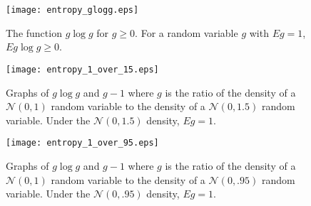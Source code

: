 \begin{subappendices}
\begin{figure}[htp]
\centering
\texttt{[image: entropy\_glogg.eps]}
\caption[$g \log g$ for $g \geq 0$]{The function $g \log g$ for $g \geq 0$. For a random variable $g$ with $E g =1$, $E g \log g \geq 0$.}\label{fig_glogg3}
\end{figure}

\begin{figure}[htp]
\centering
\texttt{[image: entropy\_1\_over\_15.eps]}
\caption[$g \log g$ and $g-1$]{Graphs of $g \log g$ and $g-1$ where  $g$ is the ratio of the density of a ${\mathcal N}(0,1)$ random variable to the density of a ${\mathcal N}(0,1.5)$ random variable.
Under the ${\mathcal N}(0,1.5)$ density, $E g =1$.}\label{fig_glogg1}
\end{figure}

\begin{figure}[htp]
\centering
\texttt{[image: entropy\_1\_over\_95.eps]}
\caption[$g \log g$ and $g-1$ again]{Graphs of $g \log g$ and $g-1$ where $g$ is the ratio of the density of a ${\mathcal N}(0,1)$ random variable to the density of a ${\mathcal N}(0,.95)$ random variable.
Under the ${\mathcal N}(0,.95)$ density, $E g =1$.}\label{fig_glogg2}
\end{figure}


\end{subappendices}